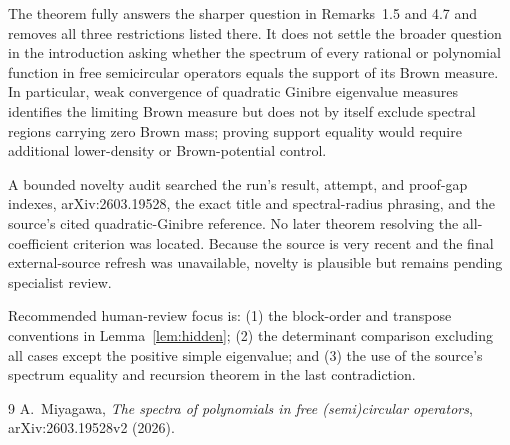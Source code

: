 \documentclass[11pt]{article}
\begin{document}
The theorem fully answers the sharper question in Remarks~1.5 and 4.7 and
removes all three restrictions listed there.  It does not settle the broader
question in the introduction asking whether the spectrum of every rational or
polynomial function in free semicircular operators equals the support of its
Brown measure.  In particular, weak convergence of quadratic Ginibre
eigenvalue measures identifies the limiting Brown measure but does not by
itself exclude spectral regions carrying zero Brown mass; proving support
equality would require additional lower-density or Brown-potential control.

A bounded novelty audit searched the run's result, attempt, and proof-gap
indexes, arXiv:2603.19528, the exact title and spectral-radius phrasing, and the
source's cited quadratic-Ginibre reference.  No later theorem resolving the
all-coefficient criterion was located.  Because the source is very recent and
the final external-source refresh was unavailable, novelty is plausible but
remains pending specialist review.

Recommended human-review focus is: (1) the block-order and transpose
conventions in Lemma~\ref{lem:hidden}; (2) the determinant comparison excluding
all cases except the positive simple eigenvalue; and (3) the use of the source's
spectrum equality and recursion theorem in the last contradiction.

\begin{thebibliography}{9}
A.~Miyagawa,
\emph{The spectra of polynomials in free (semi)circular operators},
arXiv:2603.19528v2 (2026).
\end{thebibliography}
\end{document}
